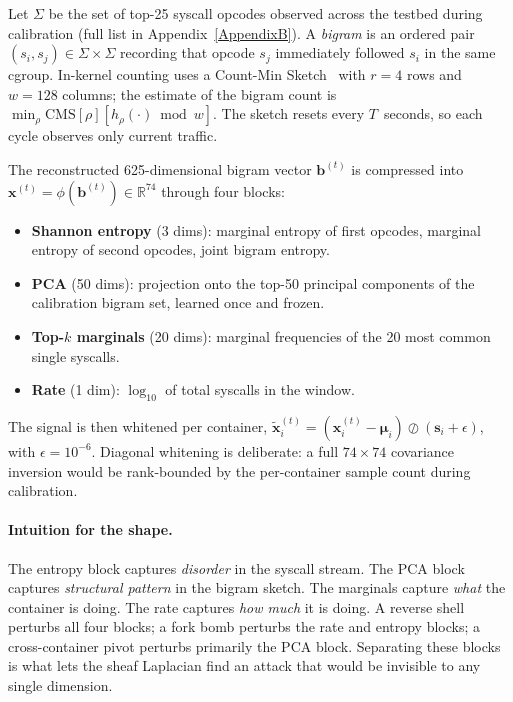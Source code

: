 Let $\Sigma$ be the set of top-25 syscall opcodes observed across the
testbed during calibration (full list in Appendix~\ref{AppendixB}). A
\emph{bigram} is an ordered pair $(s_i, s_j) \in \Sigma \times \Sigma$
recording that opcode $s_j$ immediately followed $s_i$ in the same cgroup.
In-kernel counting uses a Count-Min
Sketch~\cite{cormode2005cms} with $r{=}4$ rows and $w{=}128$ columns; the
estimate of the bigram count is $\min_\rho \mathrm{CMS}[\rho][h_\rho(\cdot)
\bmod w]$. The sketch resets every $T$~seconds, so each cycle observes
only current traffic.

The reconstructed 625-dimensional bigram vector $\mathbf{b}^{(t)}$ is
compressed into $\mathbf{x}^{(t)} = \phi(\mathbf{b}^{(t)}) \in \mathbb{R}^{74}$
through four blocks:

\begin{itemize}
  \item \textbf{Shannon entropy} (3 dims): marginal entropy of first
        opcodes, marginal entropy of second opcodes, joint bigram entropy.
  \item \textbf{PCA} (50 dims): projection onto the top-50 principal
        components of the calibration bigram set, learned once and
        frozen.
  \item \textbf{Top-$k$ marginals} (20 dims): marginal frequencies of the
        20 most common single syscalls.
  \item \textbf{Rate} (1 dim): $\log_{10}$ of total syscalls in the
        window.
\end{itemize}

The signal is then whitened per container,
$\tilde{\mathbf{x}}_i^{(t)} = (\mathbf{x}_i^{(t)} - \boldsymbol{\mu}_i)
\oslash (\mathbf{s}_i + \epsilon)$, with $\epsilon = 10^{-6}$. Diagonal
whitening is deliberate: a full $74\!\times\!74$ covariance inversion would
be rank-bounded by the per-container sample count during calibration.

\paragraph{Intuition for the shape.} The entropy block captures
\emph{disorder} in the syscall stream. The PCA block captures
\emph{structural pattern} in the bigram sketch. The marginals capture
\emph{what} the container is doing. The rate captures \emph{how much} it
is doing. A reverse shell perturbs all four blocks; a fork bomb perturbs
the rate and entropy blocks; a cross-container pivot perturbs primarily
the PCA block. Separating these blocks is what lets the sheaf Laplacian
find an attack that would be invisible to any single dimension.

